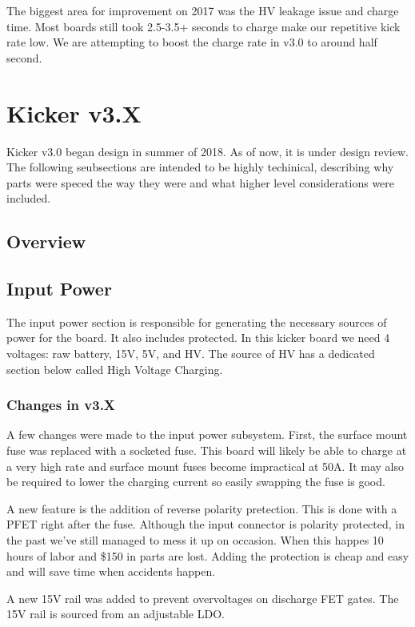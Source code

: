 \documentclass[12pt, letterpaper]{article}
\begin{document}
The biggest area for improvement on 2017 was the HV leakage issue and charge time. Most boards still took 2.5-3.5+ seconds to charge make our repetitive kick rate low. We are attempting to boost the charge rate in v3.0 to around half second. 

\section{Kicker v3.X}  
Kicker v3.0 began design in summer of 2018. As of now, it is under design review. The following seubsections are intended to be highly techinical, describing why parts were speced the way they were and what higher level considerations were included. 

\subsection{Overview}


\subsection{Input Power}
The input power section is responsible for generating the necessary sources of power for the board. It also includes protected. In this kicker board we need 4 voltages: raw battery, 15V, 5V, and HV. The source of HV has a dedicated section below called High Voltage Charging.

\subsubsection{Changes in v3.X}
A few changes were made to the input power subsystem. First, the surface mount fuse was replaced with a socketed fuse. This board will likely be able to charge at a very high rate and surface mount fuses become impractical at 50A. It may also be required to lower the charging current so easily swapping the fuse is good.

A new feature is the addition of reverse polarity pretection. This is done with a PFET right after the fuse. Although the input connector is polarity protected, in the past we've still managed to mess it up on occasion. When this happes 10 hours of labor and \$150 in parts are lost. Adding the protection is cheap and easy and will save time when accidents happen.

A new 15V rail was added to prevent overvoltages on discharge FET gates. The 15V rail is sourced from an adjustable LDO. 
\end{document}
